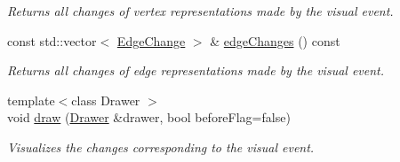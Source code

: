 \begin{DoxyCompactItemize}
\begin{DoxyCompactList}\small\item\em Returns all changes of vertex representations made by the visual event. \end{DoxyCompactList}\item 
const std\+::vector$<$ \hyperlink{structslb_1_1core_1_1ui_1_1VisualEvent_1_1EdgeChange}{Edge\+Change} $>$ \& \hyperlink{structslb_1_1core_1_1ui_1_1VisualEvent_a4bafd8d4e9755b1f3238fe3bb2a21ff3}{edge\+Changes} () const 
\begin{DoxyCompactList}\small\item\em Returns all changes of edge representations made by the visual event. \end{DoxyCompactList}\item 
{\footnotesize template$<$class Drawer $>$ }\\void \hyperlink{structslb_1_1core_1_1ui_1_1VisualEvent_a0cad78b6d8c3b94965b1a3912b679a78}{draw} (\hyperlink{structslb_1_1core_1_1ui_1_1Drawer}{Drawer} \&drawer, bool before\+Flag=false)
\begin{DoxyCompactList}\small\item\em Visualizes the changes corresponding to the visual event. \end{DoxyCompactList}\end{DoxyCompactItemize}

